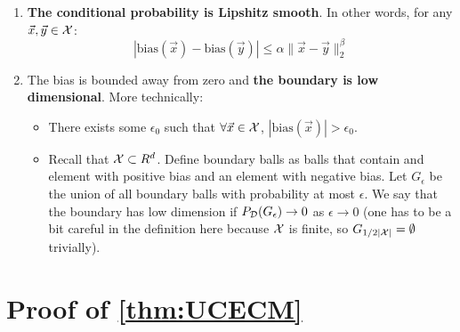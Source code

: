 \documentclass{article}
\newcommand{\X}{{\cal X}}
\newcommand{\D}{{\cal D}}
\newcommand{\x}{\vec{x}}
\newcommand{\y}{\vec{y}}
\newcommand{\bias}{\text{bias}}
\begin{document}
\begin{enumerate}
\item
  {\bf The conditional probability is Lipshitz smooth}. In other words, for
any $\x,\y \in \X$:
\[
|\bias(\x) - \bias(\y)| \leq \alpha \|\x-\y\|_2^{\beta}
\]
\item
The bias is bounded away from zero and {\bf the boundary is low
dimensional}. More technically:
\begin{itemize}
\item There exists some $\epsilon_0$ such that $\forall \x \in \X$, $|\bias(\x)|>\epsilon_0$.
\item Recall that $\X \subset R^d$. Define boundary balls as balls
  that contain and element with positive bias and an element with
  negative bias. Let $G_{\epsilon}$ be the union of all boundary balls
  with probability at most $\epsilon$. We say that the boundary has
  low dimension if $P_{\D}(G_{\epsilon}) \to 0$ as $\epsilon \to 0$
  (one has to be a bit careful in the definition here because $\X$ is finite, so
  $G_{1/2|\X|}=\emptyset$ trivially).  
\end{itemize}
\end{enumerate}

\appendix

\section{Proof of \ref{thm:UCECM}}
\end{document}

